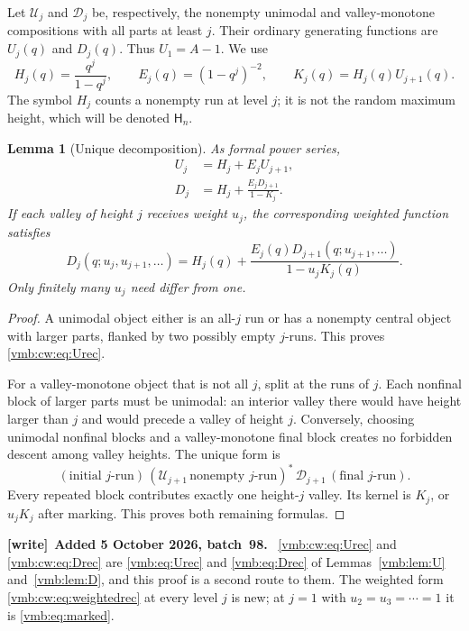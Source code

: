 \documentclass[11pt,a4paper]{article}
\numberwithin{equation}{section}
\newtheorem{lemma}[theorem]{Lemma}
\theoremstyle{definition}\newtheorem{definition}[theorem]{Definition}
\theoremstyle{remark}\newtheorem{remark}[theorem]{Remark}
\newcommand{\calD}{\mathcal D}
\newcommand{\calU}{\mathcal U}
\newenvironment{writenote}[1][]{\par\smallskip\begingroup\small
 \noindent\textbf{[write]}\if\relax\detokenize{#1}\relax\else~\textbf{#1.}\fi\ }%
 {\par\endgroup\smallskip}
\begin{document}
Let $\calU_j$ and $\calD_j$ be, respectively, the nonempty unimodal and
valley-monotone compositions with all parts at least $j$. Their ordinary
generating functions are $U_j(q)$ and $D_j(q)$. Thus $U_1=A-1$.
We use
\begin{equation}\label{vmb:cw:eq:kernels}
 H_j(q)=\frac{q^j}{1-q^j},\qquad
 E_j(q)=(1-q^j)^{-2},\qquad
 K_j(q)=H_j(q)U_{j+1}(q).
\end{equation}
The symbol $H_j$ counts a nonempty run at level $j$; it is not the random
maximum height, which will be denoted $\mathsf H_n$.

\begin{lemma}[Unique decomposition]\label{vmb:cw:lem:decomp}
As formal power series,
\begin{align}
 U_j&=H_j+E_jU_{j+1},\label{vmb:cw:eq:Urec}\\
 D_j&=H_j+\frac{E_jD_{j+1}}{1-K_j}.\label{vmb:cw:eq:Drec}
\end{align}
If each valley of height $j$ receives weight $u_j$, the corresponding
weighted function satisfies
\begin{equation}\label{vmb:cw:eq:weightedrec}
 D_j(q;u_j,u_{j+1},\ldots)
 =H_j(q)+\frac{E_j(q)D_{j+1}(q;u_{j+1},\ldots)}{1-u_jK_j(q)}.
\end{equation}
Only finitely many $u_j$ need differ from one.
\end{lemma}
\begin{proof}
A unimodal object either is an all-$j$ run or has a nonempty central object
with larger parts, flanked by two possibly empty $j$-runs. This proves
\eqref{vmb:cw:eq:Urec}.

For a valley-monotone object that is not all $j$, split at the runs of $j$.
Each nonfinal block of larger parts must be unimodal: an interior valley
there would have height larger than $j$ and would precede a valley of height
$j$. Conversely, choosing unimodal nonfinal blocks and a valley-monotone
final block creates no forbidden descent among valley heights. The unique
form is
\[
 (\text{initial }j\text{-run})\,
 (\calU_{j+1}\,\text{nonempty }j\text{-run})^*\,
 \calD_{j+1}\,(\text{final }j\text{-run}).
\]
Every repeated block contributes exactly one height-$j$ valley. Its kernel
is $K_j$, or $u_jK_j$ after marking. This proves both remaining formulas.
\end{proof}

\begin{writenote}[Added 5 October 2026, batch~98]
\eqref{vmb:cw:eq:Urec} and \eqref{vmb:cw:eq:Drec} are \eqref{vmb:eq:Urec} and
\eqref{vmb:eq:Drec} of Lemmas~\ref{vmb:lem:U} and~\ref{vmb:lem:D}, and this
proof is a second route to them. The weighted form
\eqref{vmb:cw:eq:weightedrec} at every level $j$ is new; at $j=1$ with
$u_2=u_3=\cdots=1$ it is \eqref{vmb:eq:marked}.
\end{writenote}
\end{document}
